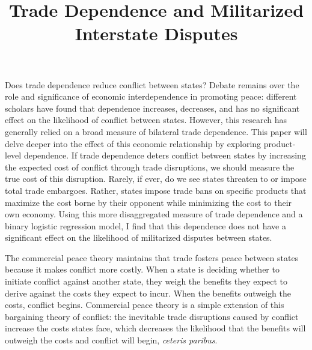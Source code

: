 \documentclass[
  letterpaper,
]{article}
\title{Trade Dependence and Militarized Interstate Disputes}
\author{}
\date{}
\begin{document}
\maketitle
\ifdefined\Shaded\renewenvironment{Shaded}{\begin{tcolorbox}[borderline west={3pt}{0pt}{shadecolor}, interior hidden, enhanced, breakable, frame hidden, sharp corners, boxrule=0pt]}{\end{tcolorbox}}\fi

Does trade dependence reduce conflict between states? Debate remains
over the role and significance of economic interdependence in promoting
peace: different scholars have found that dependence increases,
decreases, and has no significant effect on the likelihood of conflict
between states. However, this research has generally relied on a broad
measure of bilateral trade dependence. This paper will delve deeper into
the effect of this economic relationship by exploring product-level
dependence. If trade dependence deters conflict between states by
increasing the expected cost of conflict through trade disruptions, we
should measure the true cost of this disruption. Rarely, if ever, do we
see states threaten to or impose total trade embargoes. Rather, states
impose trade bans on specific products that maximize the cost borne by
their opponent while minimizing the cost to their own economy. Using
this more disaggregated measure of trade dependence and a binary
logistic regression model, I find that this dependence does not have a
significant effect on the likelihood of militarized disputes between
states.

\newpage{}

The commercial peace theory maintains that trade fosters peace between
states because it makes conflict more costly. When a state is deciding
whether to initiate conflict against another state, they weigh the
benefits they expect to derive against the costs they expect to incur.
When the benefits outweigh the costs, conflict begins. Commercial peace
theory is a simple extension of this bargaining theory of conflict: the
inevitable trade disruptions caused by conflict increase the costs
states face, which decreases the likelihood that the benefits will
outweigh the costs and conflict will begin, \emph{ceteris paribus}.
\end{document}
